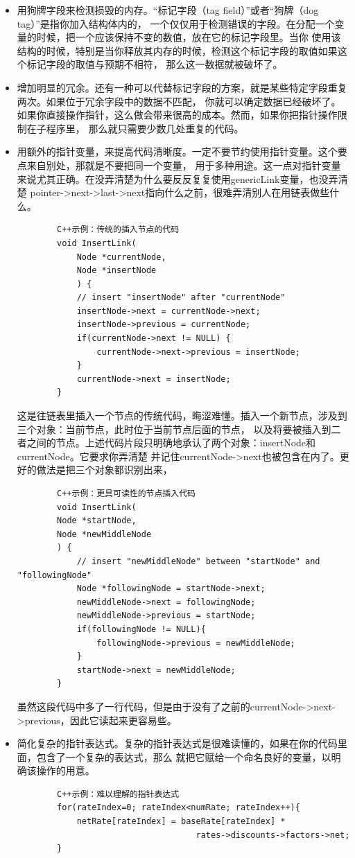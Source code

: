 \documentclass{article}
\begin{document}
\begin{itemize}
    \item 用狗牌字段来检测损毁的内存。“标记字段（tag field）”或者“狗牌（dog tag）”是指你加入结构体内的，
    一个仅仅用于检测错误的字段。在分配一个变量的时候，把一个应该保持不变的数值，放在它的标记字段里。当你
    使用该结构的时候，特别是当你释放其内存的时候，检测这个标记字段的取值如果这个标记字段的取值与预期不相符，
    那么这一数据就被破坏了。
    \item 增加明显的冗余。还有一种可以代替标记字段的方案，就是某些特定字段重复两次。如果位于冗余字段中的数据不匹配，
    你就可以确定数据已经破坏了。如果你直接操作指针，这么做会带来很高的成本。然而，如果你把指针操作限制在子程序里，
    那么就只需要少数几处重复的代码。
    \item 用额外的指针变量，来提高代码清晰度。一定不要节约使用指针变量。这个要点来自别处，那就是不要把同一个变量，
    用于多种用途。这一点对指针变量来说尤其正确。在没弄清楚为什么要反反复复使用genericLink变量，也没弄清楚
    pointer->next->last->next指向什么之前，很难弄清别人在用链表做些什么。
    \begin{lstlisting}
        C++示例：传统的插入节点的代码
        void InsertLink(
            Node *currentNode,
            Node *insertNode
            ) {
            // insert "insertNode" after "currentNode"
            insertNode->next = currentNode->next;
            insertNode->previous = currentNode;
            if(currentNode->next != NULL) {
                currentNode->next->previous = insertNode;
            }
            currentNode->next = insertNode;
        }
    \end{lstlisting}
    这是往链表里插入一个节点的传统代码，晦涩难懂。插入一个新节点，涉及到三个对象：当前节点，此时位于当前节点后面的节点，
    以及将要被插入到二者之间的节点。上述代码片段只明确地承认了两个对象：insertNode和currentNode。它要求你弄清楚
    并记住currentNode->next也被包含在内了。更好的做法是把三个对象都识别出来，
    \begin{lstlisting}
        C++示例：更具可读性的节点插入代码
        void InsertLink(
        Node *startNode,
        Node *newMiddleNode
        ) {
            // insert "newMiddleNode" between "startNode" and "followingNode"
            Node *followingNode = startNode->next;
            newMiddleNode->next = followingNode;
            newMiddleNode->previous = startNode;
            if(followingNode != NULL){
                followingNode->previous = newMiddleNode;
            }
            startNode->next = newMiddleNode;
        }
    \end{lstlisting}
    虽然这段代码中多了一行代码，但是由于没有了之前的currentNode->next->previous，因此它读起来更容易些。
    \item 简化复杂的指针表达式。复杂的指针表达式是很难读懂的，如果在你的代码里面，包含了一个复杂的表达式，那么
    就把它赋给一个命名良好的变量，以明确该操作的用意。
    \begin{lstlisting}
        C++示例：难以理解的指针表达式
        for(rateIndex=0; rateIndex<numRate; rateIndex++){
            netRate[rateIndex] = baseRate[rateIndex] * 
                                    rates->discounts->factors->net;
        }


\end{lstlisting}
\end{itemize}
\end{document}
